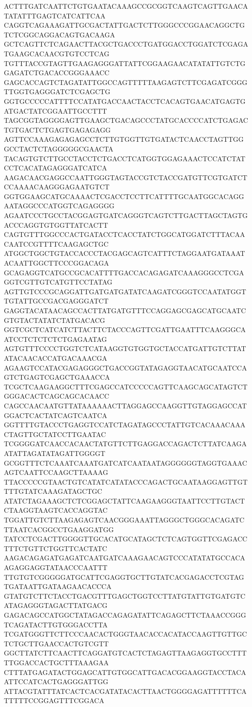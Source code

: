 ACTTTGATCAATTCTGTGAATACAAAGCCGCGGTCAAGTCAGTTGAACATATATTTGAGTCATCATTCAA
CAGGTCAGAAAGATTGCGACTATTGACTCTTGGGCCCGGAACAGGCTGTCTCGGCAGGACAGTGACAAGA
GCTCAGTTCTCAGAACTTACGCTGACCCTGATGGACCTGGATCTCGAGATGAAGCACAACGTGTCCTCAG
TGTTTACCGTAGTTGAAGAGGGATTATTCGGAAGAACATATATTGTCTGGAGATCTGACACCGGGAAACC
GAGCACCAGTCTAGATATTGGCCAGTTTTTAAGAGTCTTCGAGATCGGGTTGGTGAGGGATCTCGAGCTG
GGTGCCCCCATTTTCCATATGACCAACTACCTCACAGTGAACATGAGTGATGACTATCGGAATTGCCTTT
TAGCGGTAGGGGAGTTGAAGCTGACAGCCCTATGCACCCCATCTGAGACTGTGACTCTGAGTGAGAGAGG
AGTTCCAAAGAGAGAGCCTCTTGTGGTTGTGATACTCAACCTAGTTGGGCCTACTCTAGGGGGCGAACTA
TACAGTGTCTTGCCTACCTCTGACCTCATGGTGGAGAAACTCCATCTATCCTCACATAGAGGGATCATCA
AAGACAACGAGGCCAATTGGGTAGTACCGTCTACCGATGTTCGTGATCTCCAAAACAAGGGAGAATGTCT
GGTGGAAGCATGCAAAACTCGACCTCCTTCATTTTGCAATGGCACAGGAATAGGCCCATGGTCAGAGGGG
AGAATCCCTGCCTACGGAGTGATCAGGGTCAGTCTTGACTTAGCTAGTGACCCAGGTGTGGTTATCACTT
CAGTGTTTGGCCCACTGATACCTCACCTATCTGGCATGGATCTTTACAACAATCCGTTTTCAAGAGCTGC
ATGGCTGGCTGTACCACCCTACGAGCAGTCATTTCTAGGAATGATAAATACAATTGGCTTCCCGGACAGA
GCAGAGGTCATGCCGCACATTTTGACCACAGAGATCAAAGGGCCTCGAGGTCGTTGTCATGTTCCTATAG
AGTTGTCCCGCAGGATTGATGATGATATCAAGATCGGGTCCAATATGGTTGTATTGCCGACGAGGGATCT
GAGGTACATAACAGCCACTTATGATGTTTCCAGGAGCGAGCATGCAATCGTGTACTATATCTATGACACG
GGTCGCTCATCATCTTACTTCTACCCAGTTCGATTGAATTTCAAGGGCAATCCTCTCTCTCTGAGAATAG
AGTGTTTCCCCTGGTCTCATAAGGTGTGGTGCTACCATGATTGTCTTATATACAACACCATGACAAACGA
AGAAGTCCATACGAGAGGGCTGACCGGTATAGAGGTAACATGCAATCCAGTCTGAGTCGAGCTGAAACCA
TCGCTCAAGAAGGCTTTCGAGCCATCCCCCAGTTCAAGCAGCATAGTCTGGGACACTCAGCAGCACAACC
CAGCCAACAATGTTATAAAAAACTTAGGAGCCAAGGTTGTAGGAGCCATGGACTCACTATCAGTCAATCA
GGTTTTGTACCCTGAGGTCCATCTAGATAGCCCTATTGTCACAAACAAACTAGTTGCTATCCTTGAATAC
TCGGGGATCAACCACAACTATGTTCTTGAGGACCAGACTCTTATCAAGAATATTAGATATAGATTGGGGT
GCGGTTTCTCAAATCAAATGATCATCAATAATAGGGGGGTAGGTGAAACAGTCAATTCCAAGCTTAAAAG
TTACCCCCGTAACTGTCATATCATATACCCAGACTGCAATAAGGAGTTGTTTTGTATCAAAGATAGCTGC
ATATCTAGAAAGCTCTCGGAGCTATTCAAGAAGGGTAATTCCTTGTACTCTAAGGTAAGTCACCAGGTAC
TGGATTGTCTTAAGAGAGTCAACGGGAAATTAGGGCTGGGCACAGATCTTAATCACGGCCTGAAGGATGG
TATCCTCGACTTGGGGTTGCACATGCATAGCTCTCAGTGGTTCGAGACCTTTCTGTTCTGGTTCACTATC
AAGACAGAGATGAGATCAATGATCAAAGAACAGTCCCATATATGCCACAAGAGGAGGTATAACCCAATTT
TTGTGTCGGGGGATGCATTCGAGGTGCTTGTATCACGAGACCTCGTAGTGATAATTGATAAGAACACCCA
GTATGTCTTCTACCTGACGTTTGAGCTGGTCCTTATGTATTGTGATGTCATAGAGGGTAGACTTATGACG
GAGACAGCCATGGCTATAGACCAGAGATATTCAGAGCTTCTAAACCGGGTCAGATACTTGTGGGACCTTA
TCGATGGGTTCTTCCCAACACTGGGTAACACCACATACCAAGTTGTTGCTCTGCTTGAACCACTGTCGTT
GGCTTATCTTCAACTTCAGGATGTCACTCTAGAGTTAAGAGGTGCCTTTTTGGACCACTGCTTTAAAGAA
CTTTATGAGATACTGGAGCATTGTGGCATTGACACGGAAGGTACCTACAATTCCATCACTGAGGGATTGG
ATTACGTATTTATCACTCACGATATACACTTAACTGGGGAGATTTTTTCATTTTTCCGGAGTTTCGGACA
